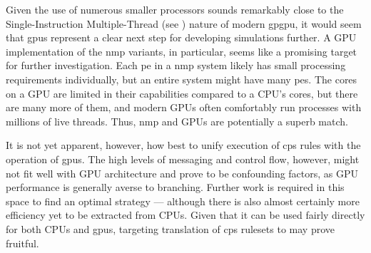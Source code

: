 
Given the use of numerous smaller processors sounds remarkably close to the Single-Instruction Multiple-Thread (see \cite[Ch. 4.4.1]{Hennessy2012}) nature of modern \gls{gpgpu}, it would seem that \glspl{gpu} represent a clear next step for developing simulations further.  A GPU implementation of the \gls{nmp} variants, in particular, seems like a promising target for further investigation.  Each \gls{pe} in a \gls{nmp} system likely has small processing requirements individually, but an entire system might have many \glspl{pe}.  The cores on a GPU are limited in their capabilities compared to a CPU's cores, but there are many more of them, and modern GPUs often comfortably run processes with millions of live threads.  Thus, \gls{nmp} and GPUs are potentially a superb match.

It is not yet apparent, however, how best to unify execution of \gls{cps} rules with the operation of \glspl{gpu}.  The high levels of messaging and control flow, however, might not fit well with GPU architecture and prove to be confounding factors, as GPU performance is generally averse to branching.  Further work is required in this space to find an optimal strategy --- although there is also almost certainly more efficiency yet to be extracted from CPUs.  Given that it can be used fairly directly for both CPUs and \glspl{gpu}, targeting translation of \gls{cps} \glspl{ruleset} to  may prove fruitful.

